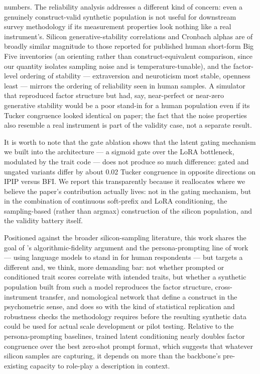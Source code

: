\documentclass[11pt]{article}
\begin{document}
numbers. The reliability analysis addresses a different kind of concern: even a genuinely construct-valid synthetic population is not useful for downstream survey methodology if its measurement properties look nothing like a real instrument's. Silicon generative-stability correlations and Cronbach alphas are of broadly similar magnitude to those reported for published human short-form Big Five inventories (an orienting rather than construct-equivalent comparison, since our quantity isolates sampling noise and is temperature-tunable), and the factor-level ordering of stability — extraversion and neuroticism most stable, openness least — mirrors the ordering of reliability seen in human samples. A simulator that reproduced factor structure but had, say, near-perfect or near-zero generative stability would be a poor stand-in for a human population even if its Tucker congruence looked identical on paper; the fact that the noise properties also resemble a real instrument is part of the validity case, not a separate result.

It is worth to note that the gate ablation  shows that the latent gating mechanism we built into the architecture — a sigmoid gate over the LoRA bottleneck, modulated by the trait code — does not produce so much difference: gated and ungated variants differ by about 0.02 Tucker congruence in opposite directions on IPIP versus BFI. We report this transparently because it reallocates where we believe the paper's contribution actually lives: not in the gating mechanism, but in the combination of continuous soft-prefix and LoRA conditioning, the sampling-based (rather than argmax) construction of the silicon population, and the validity battery itself.

Positioned against the broader silicon-sampling literature, this work shares the goal of \citet{argyle2023}'s algorithmic-fidelity argument and the persona-prompting line of work \citep{serapiogarcia2023,jiang2023} — using language models to stand in for human respondents — but targets a different and, we think, more demanding bar: not whether prompted or conditioned trait scores correlate with intended traits, but whether a synthetic population built from such a model reproduces the factor structure, cross-instrument transfer, and nomological network that define a construct in the psychometric sense, and does so with the kind of statistical replication and robustness checks the methodology requires before the resulting synthetic data could be used for actual scale development or pilot testing. Relative to the persona-prompting baselines, trained latent conditioning nearly doubles factor congruence over the best zero-shot prompt format, which suggests that whatever silicon samples are capturing, it depends on more than the backbone's pre-existing capacity to role-play a description in context.
\end{document}
